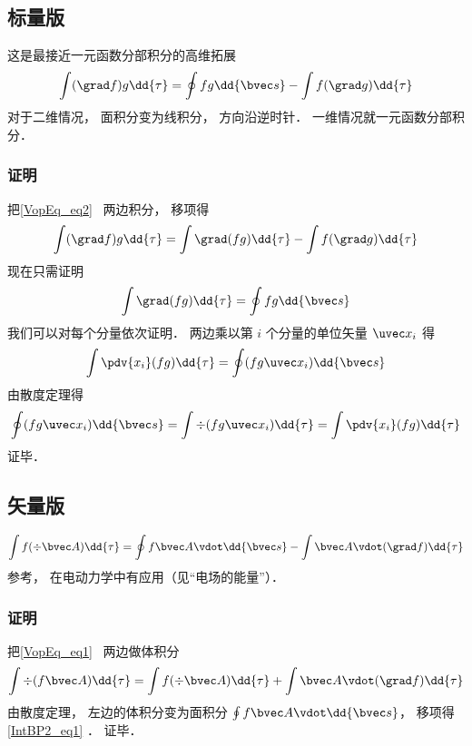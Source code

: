 

\subsection{标量版}
这是最接近一元函数分部积分的高维拓展
\begin{equation}\label{IntBP2_eq2}
\int (\grad f) g \dd{\tau} = \oint fg \dd{\bvec s} - \int f (\grad g) \dd{\tau}
\end{equation}
对于二维情况， 面积分变为线积分， 方向沿逆时针． 一维情况就一元函数分部积分．

\subsubsection{证明}
把\autoref{VopEq_eq2}~ 两边积分， 移项得
\begin{equation}
\int (\grad f) g \dd{\tau} = \int \grad (fg) \dd{\tau} - \int f (\grad g) \dd{\tau}
\end{equation}
现在只需证明
\begin{equation}
\int \grad (fg) \dd{\tau} = \oint fg \dd{\bvec s}
\end{equation}
我们可以对每个分量依次证明． 两边乘以第 $i$ 个分量的单位矢量 $\uvec x_i$ 得
\begin{equation}
\int \pdv{x_i}(fg) \dd{\tau} = \oint (fg\uvec x_i) \dd{\bvec s}
\end{equation}
由散度定理得
\begin{equation}
\oint (fg\uvec x_i) \dd{\bvec s} = \int \div (fg\uvec x_i) \dd{\tau} = \int \pdv{x_i}(fg) \dd{\tau}
\end{equation}
证毕．

\subsection{矢量版}
\begin{equation}\label{IntBP2_eq1}
\int f (\div \bvec A)\dd{\tau} =  \oint f \bvec A \vdot \dd{\bvec s} - \int\bvec A \vdot (\grad f)\dd{\tau}
\end{equation}
参考\cite{GriffE}， 在电动力学中有应用（见“电场的能量”）．

\subsubsection{证明}
把\autoref{VopEq_eq1}~ 两边做体积分
\begin{equation}
\int\div (f \bvec A) \dd{\tau} = \int f (\div \bvec A)\dd{\tau} + \int\bvec A \vdot (\grad f)\dd{\tau}
\end{equation}
由散度定理， 左边的体积分变为面积分 $\oint f \bvec A \vdot \dd{\bvec s}$， 移项得\autoref{IntBP2_eq1} ． 证毕．

